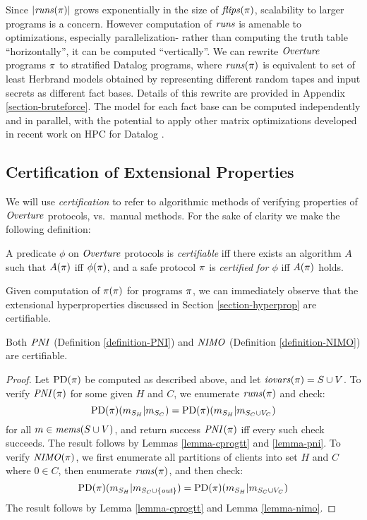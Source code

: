 Since $|\mathit{runs}(\pi)|$ grows exponentially in the size of
$\mathit{flips}(\pi)$, scalability to larger programs is a concern.  However
computation of $\mathit{runs}$ is amenable to optimizations, especially
parallelization- rather than computing the truth table
``horizontally'', it can be computed ``vertically''. We can rewrite
$\mathit{Overture}$ programs $\pi$ to stratified Datalog programs, where
$\mathit{runs}(\pi)$ is equivalent to set of least Herbrand models obtained
by representing different random tapes and input secrets as different
fact bases. Details of this rewrite are provided in Appendix
\ref{section-bruteforce}. The model for each fact base can be computed
independently and in parallel, with the potential to apply other
matrix optimizations developed in recent work on HPC for Datalog
\cite{sakama2017linear,aspis2018linear,nguyen2022enhancing,nguyen2021efficient}.

\subsection{Certification of Extensional Properties}
\label{section-automation-extensional}

We will use \emph{certification} to refer to algorithmic methods of
verifying properties of $\mathit{Overture}$ protocols, vs.~manual methods. For
the sake of clarity we make the following definition:
\begin{definition}
  A predicate $\phi$ on $\mathit{Overture}$ protocols is \emph{certifiable} iff
  there exists an algorithm $A$ such that $A(\pi)$ iff $\phi(\pi)$,
  and a safe protocol $\pi$ is \emph{certified for $\phi$} iff
  $A(\pi)$ holds.
\end{definition}

Given computation of $\pi(\pi)$ for programs $\pi$, we can
immediately observe that the extensional hyperproperties discussed in
Section \ref{section-hyperprop} are certifiable.
\begin{lemma}
  Both $\mathit{PNI}$ (Definition \ref{definition-PNI}) and $\mathit{NIMO}$ (Definition \ref{definition-NIMO}) are certifiable. 
\end{lemma}

\begin{proof}
  Let $\mathrm{PD}(\pi)$ be computed as described above, and let $\mathit{iovars}(\pi) = S
  \cup V$. To verify $\mathit{PNI}(\pi)$ for
  some given $H$ and $C$, we enumerate $\mathit{runs}(\pi)$ and check:
  $$
  \mathrm{PD}(\pi)(m_{S_H}|m_{S_C}) =
  \mathrm{PD}(\pi)(m_{S_H}|m_{S_C \cup V_C})
  $$
  for all $m \in \mathit{mems}(S \cup V)$, and return success $\mathit{PNI}(\pi)$ iff every such
  check succeeds. The result follows by Lemmas \ref{lemma-cprogtt} and \ref{lemma-pni}.
  To verify $\mathit{NIMO}(\pi)$, we first enumerate all partitions of clients
  into set $H$ and $C$ where $0 \in C$, then enumerate $\mathit{runs}(\pi)$, and
  then check:
  $$
  \mathrm{PD}(\pi)(m_{S_H}|m_{S_C \cup \{\mathit{out}\}}) =
  \mathrm{PD}(\pi)(m_{S_H}|m_{S_C \cup V_C})
  $$
  The result follows by Lemma \ref{lemma-cprogtt} and Lemma \ref{lemma-nimo}.
\end{proof}

